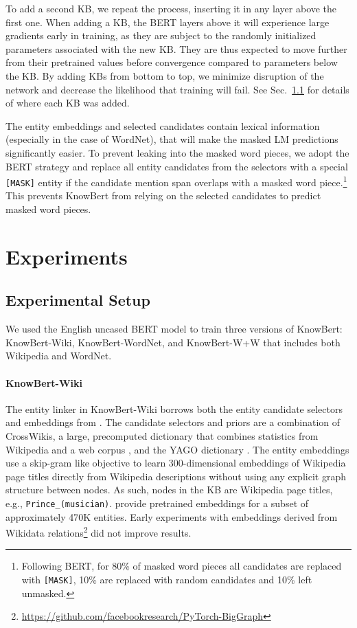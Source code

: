 \documentclass[11pt,a4paper]{article}
\newcommand{\KB}[0]{KnowBert}
\newcommand{\KBS}[0]{KnowBert }
\newcommand{\KWIKI}[0]{KnowBert-Wiki}
\newcommand{\KWORDNET}[0]{KnowBert-WordNet}
\newcommand{\KWIKIS}[0]{KnowBert-Wiki }
\newcommand{\KWANDWS}[0]{KnowBert-W+W }
\newcommand{\BBS}[0]{BERT }
\begin{document}
To add a second KB, we repeat the process, inserting it in any layer above the first one.
When adding a KB, the BERT layers above it will experience large gradients early in training,
as they are subject to the randomly initialized parameters associated with the new KB.
They are thus expected to move further from their pretrained values before convergence compared to parameters below the KB.
By adding KBs from bottom to top, we minimize disruption of the network and decrease the likelihood that training will fail.
See Sec.~\ref{sec:exp_setup} for details of where each KB was added.

The entity embeddings and selected candidates contain lexical information (especially in the case of WordNet), that will make the masked LM predictions significantly easier.
To prevent leaking into the masked word pieces, we adopt the BERT strategy and replace all entity candidates from the selectors with a special \texttt{[MASK]} entity if the candidate mention span overlaps with a masked word piece.\footnote{Following BERT, for 80\% of masked word pieces all candidates are replaced with \texttt{[MASK]}, 10\% are replaced with random candidates and 10\% left unmasked.}
This prevents \KBS from relying on the selected candidates to predict masked word pieces.



\section{Experiments} 

\subsection{Experimental Setup}
\label{sec:exp_setup}
We used the English uncased \BBS model \cite{Devlin2018} to train three versions of \KB: \KWIKI, \KWORDNET, and \KWANDWS that includes both Wikipedia and WordNet.

\paragraph{\KWIKI} The entity linker in \KWIKIS borrows both the entity candidate selectors and embeddings from \citet{Ganea2017DeepJE}.
The candidate selectors and priors are a combination of CrossWikis, a large, precomputed dictionary that combines statistics from Wikipedia and a web corpus \cite{spitkovsky-chang-2012-cross}, and the YAGO dictionary \cite{Hoffart2011RobustDO}.
The entity embeddings use a skip-gram like objective \cite{word2vec} to learn 300-dimensional embeddings of Wikipedia page titles directly from Wikipedia descriptions without using any explicit graph structure between nodes.
As such, nodes in the KB are Wikipedia page titles, e.g., \texttt{Prince\_(musician)}.
\citet{Ganea2017DeepJE} provide pretrained embeddings for a subset of approximately 470K entities.
Early experiments with embeddings derived from Wikidata relations\footnote{\url{https://github.com/facebookresearch/PyTorch-BigGraph}} did not improve results.
\end{document}
